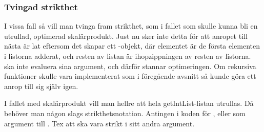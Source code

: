 \documentclass[Rapport]{subfiles}
\begin{document}
\subsubsection{Tvingad strikthet}

I vissa fall så vill man tvinga fram strikthet, som i fallet 
 som skulle kunna bli en utrullad,
optimerad skalärprodukt. Just nu sker inte detta för att anropet till nästa
 är lat eftersom det skapar ett -objekt, där elementet är de första
elementen i listorna adderat, och resten av listan är ihopzippningen av resten
av listorna.  ska inte evaluera sina argument, och därför stannar
optimeringen. Om rekursiva funktioner skulle vara implementerat som i föregående
avsnitt så kunde göra ett anrop till sig själv igen.

    I fallet med skalärprodukt vill man hellre att hela getIntList-listan 
utrullas. Då behöver man någon slags strikthetsnotation. Antingen i koden 
för , eller som argument till . Tex att  ska vara strikt i 
sitt andra argument.
\end{document}
